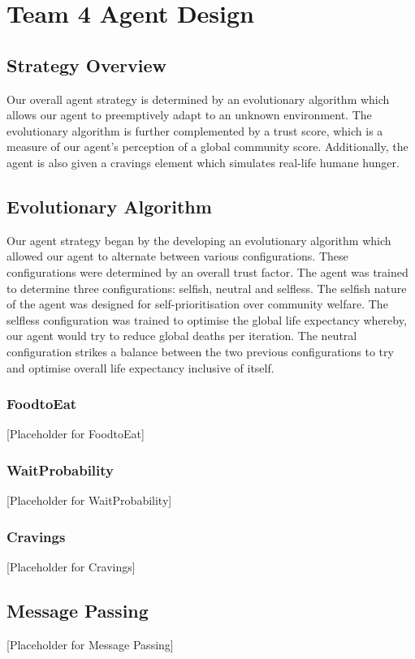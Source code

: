 \chapter{Team 4 Agent Design}\label{team_4_agent_design}

\section{Strategy Overview}
Our overall agent strategy is determined by an evolutionary algorithm which allows our agent to preemptively adapt to an unknown environment. 
The evolutionary algorithm is further complemented by a trust score, which is a measure of our agent's perception of a global community score.
Additionally, the agent is also given a cravings element which simulates real-life humane hunger.

\section{Evolutionary Algorithm}
Our agent strategy began by the developing an evolutionary algorithm which allowed our agent to alternate between various configurations. These 
configurations were determined by an overall trust factor. The agent was trained to determine three configurations: selfish, neutral and selfless.
The selfish nature of the agent was designed for self-prioritisation over community welfare. The selfless configuration was trained to optimise
the global life expectancy whereby, our agent would try to reduce global deaths per iteration. The neutral configuration strikes a balance between
the two previous configurations to try and optimise overall life expectancy inclusive of itself.

\subsection{FoodtoEat}
[Placeholder for FoodtoEat]

\subsection{WaitProbability}
[Placeholder for WaitProbability]

\subsection{Cravings}
[Placeholder for Cravings]

\section{Message Passing}
[Placeholder for Message Passing]

